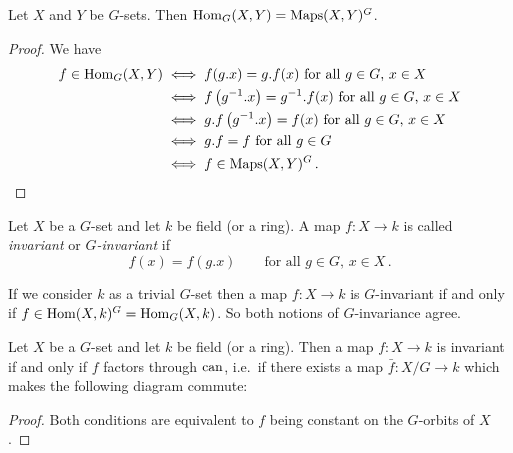 \begin{lem}
  Let $X$ and $Y$ be $G$-sets.
  Then $\operatorname{Hom}_G(X,Y) = \operatorname{Maps}(X,Y)^G$.
\end{lem}
\begin{proof}
  We have
  \begin{align*}
          f \in \operatorname{Hom}_G(X,Y)
    &\iff \text{$f(g.x) = g.f(x)$ for all $g \in G$, $x \in X$} \\
    &\iff \text{$f\left( g^{-1}.x \right) = g^{-1}.f(x)$ for all $g \in G$, $x \in X $} \\
    &\iff \text{$g.f\left( g^{-1}.x \right) = f(x)$ for all $g \in G$, $x \in X$} \\
    &\iff \text{$g.f = f$ for all $g \in G$}  \\
    &\iff f \in \operatorname{Maps}(X,Y)^G \,.
    \qedhere
  \end{align*}
\end{proof}


\begin{defi}
  Let $X$ be a $G$-set and let $k$ be field \textup(or a ring\textup).
  A map $f \colon X \to k$ is called \emph{invariant} or \emph{$G$-invariant} if
  \[
      f(x)
    = f\left( g.x \right)
    \qquad
    \text{for all $g \in G$, $x \in X$} \,.
  \]
\end{defi}


\begin{note}
  If we consider $k$ as a trivial $G$-set then a map $f \colon X \to k$ is $G$-invariant if and only if $f \in \operatorname{Hom}(X,k)^G = \operatorname{Hom}_G(X,k)$.
  So both notions of $G$-invariance agree.
\end{note}


\begin{lem}
  Let $X$ be a $G$-set and let $k$ be field \textup(or a ring\textup).
  Then a map $f \colon X \to k$ is invariant if and only if $f$ factors through $\operatorname{can}$, i.e.\ if there exists a map $\bar{f} \colon X/G \to k$ which makes the following diagram commute:
  \begin{center}
  \end{center}
\end{lem}
\begin{proof}
  Both conditions are equivalent to $f$ being constant on the $G$-orbits of $X$.
\end{proof}


